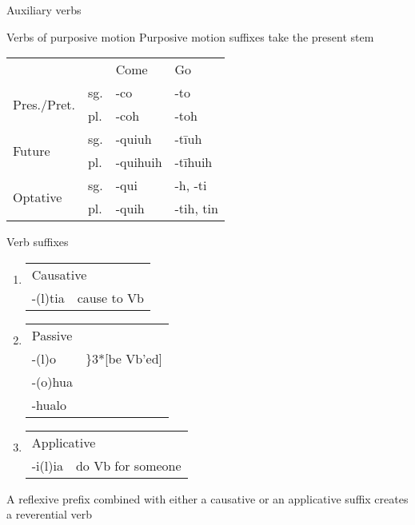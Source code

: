 \documentclass[12pt]{beamer}
\newcommand{\nah}[1]{\textcolor{nahgrn}{#1}}
\newcommand{\trs}[1]{\textcolor{nahblu}{#1}}
\begin{document}
\begin{frame}
\begin{columns}[t]
\begin{column}{.18\linewidth}
\begin{block}{Auxiliary verbs}
      \end{block}
      \begin{block}{Verbs of purposive motion}
        Purposive motion suffixes take the present stem
        \begin{tabular}{llll}
                                       &     & \trs{Come}     & \trs{Go}          \\
          \multirow{2}{*}{Pres./Pret.} & sg. & \nah{-co}      & \nah{-to}         \\
                                       & pl. & \nah{-coh}     & \nah{-toh}        \\
          \multirow{2}{*}{Future}      & sg. & \nah{-quiuh}   & \nah{-tīuh}       \\
                                       & pl. & \nah{-quihuih} & \nah{-tīhuih}     \\
          \multirow{2}{*}{Optative}    & sg. & \nah{-qui}     & \nah{-h,   -ti}   \\
                                       & pl. & \nah{-quih}    & \nah{-tih,   tin} \\
        \end{tabular}
      \end{block}
      \begin{block}{Verb suffixes}
        \begin{enumerate}
          \item
                \begin{tabular}[t]{ll}
                  \multicolumn{2}{l}{Causative}     \\
                  \nah{-(l)tia} & \trs{cause to Vb}
                \end{tabular}
          \item
                \begin{tabular}[t]{ll}
                  \multicolumn{2}{l}{Passive}                                  \\
                  \nah{-(l)o}   & \trs{\hspace{-1em}\rdelim\}{3}{*}[be Vb'ed]} \\
                  \nah{-(o)hua} &                                              \\
                  \nah{-hualo}  &                                              \\
                \end{tabular}
          \item
                \begin{tabular}[t]{ll}
                  \multicolumn{2}{l}{Applicative}         \\
                  \nah{-i(l)ia} & \trs{do Vb for someone}
                \end{tabular}
        \end{enumerate}
        A reflexive prefix combined with either a causative or an applicative suffix creates a reverential verb
      \end{block}


\end{column}
\end{columns}
\end{frame}
\end{document}
